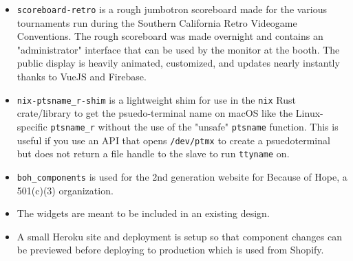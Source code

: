 \documentclass[10pt,letter,ragged2e]{altacv}
\begin{document}
\begin{paracol}{2}
\divider


\begin{itemize}
\item \texttt{scoreboard-retro} is a rough jumbotron scoreboard made for the various tournaments run during the Southern California Retro Videogame Conventions. The rough scoreboard was made overnight and contains an "administrator" interface that can be used by the monitor at the booth. The public display is heavily animated, customized, and updates nearly instantly thanks to VueJS and Firebase.
\end{itemize}

\divider


\begin{itemize}
\item \texttt{nix-ptsname\_r-shim} is a lightweight shim for use in the \texttt{nix} Rust crate/library to get the psuedo-terminal name on macOS like  the Linux-specific \texttt{ptsname\_r} without the use of the "unsafe" \texttt{ptsname} function. This is useful if you use an API that opens \texttt{/dev/ptmx} to create a psuedoterminal but does not return a file handle to the slave to run \texttt{ttyname} on.
\end{itemize}

\divider


\begin{itemize}
\item \texttt{boh\_components} is used for the 2nd generation website for Because of Hope, a 501(c)(3) organization.
\item The widgets are meant to be included in an existing design.
\item A small Heroku site and deployment is setup so that component changes can be previewed before deploying to production which is used from Shopify.
\end{itemize}

\divider



\end{paracol}
\end{document}
